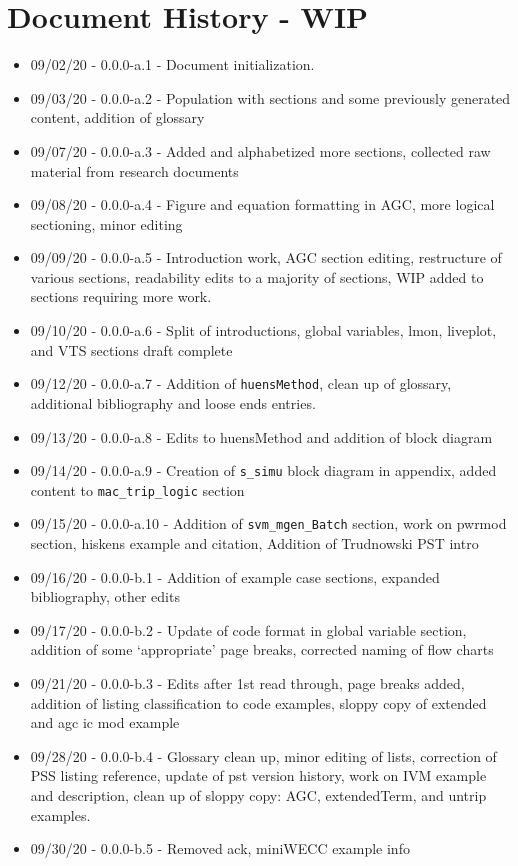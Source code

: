 \chapter{Document History  - WIP}

\begin{itemize}
\itemsep 0em
\item 09/02/20 - 0.0.0-a.1 - Document initialization.
\item 09/03/20 - 0.0.0-a.2 - Population with sections and some previously generated content, addition of glossary
\item 09/07/20 - 0.0.0-a.3 - Added and alphabetized more sections, collected raw material from research documents
\item 09/08/20 - 0.0.0-a.4 - Figure and equation formatting in AGC, more logical sectioning, minor editing
\item 09/09/20 - 0.0.0-a.5 - Introduction work, AGC section editing, restructure of various sections, readability edits to a majority of sections, WIP added to sections requiring more work.
\item 09/10/20 - 0.0.0-a.6 - Split of introductions, global variables, lmon, liveplot, and VTS sections draft complete
\item 09/12/20 - 0.0.0-a.7 - Addition of \verb|huensMethod|, clean up of glossary, additional bibliography and loose ends entries.
\item 09/13/20 - 0.0.0-a.8 - Edits to huensMethod and addition of block diagram 
\item 09/14/20 - 0.0.0-a.9 - Creation of \verb|s_simu| block diagram in appendix, added content to \verb|mac_trip_logic| section
\item 09/15/20 - 0.0.0-a.10 - Addition of \verb|svm_mgen_Batch| section, work on pwrmod section, hiskens example and citation, Addition of Trudnowski PST intro
\item 09/16/20 - 0.0.0-b.1 - Addition of example case sections, expanded bibliography, other edits 
\item 09/17/20 - 0.0.0-b.2 - Update of code format in global variable section, addition of some `appropriate' page breaks, corrected naming of flow charts
\item 09/21/20 - 0.0.0-b.3 - Edits after 1st read through, page breaks added, addition of listing classification to code examples, sloppy copy of extended and agc ic mod example
\item 09/28/20 - 0.0.0-b.4 - Glossary clean up, minor editing of lists, correction of PSS listing reference, update of pst version history, work on IVM example and description, clean up of sloppy copy: AGC, extendedTerm, and untrip examples.
\item 09/30/20 - 0.0.0-b.5 - Removed ack, miniWECC example info 
\end{itemize}